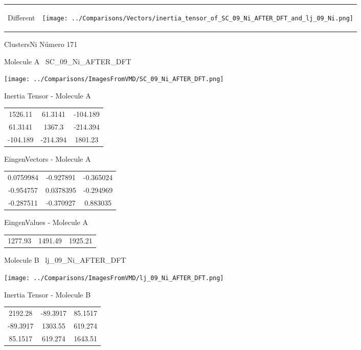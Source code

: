 \vtab[-5mm]
\begin{tabular}{*{2}{m{}}}
\begin{center}
\textcolor{NavyBlue}{\Large Different}
\end{center}
&
\begin{center}
\texttt{[image: ../Comparisons/Vectors/inertia\_tensor\_of\_SC\_09\_Ni\_AFTER\_DFT\_and\_lj\_09\_Ni.png]}
\end{center}
\end{tabular}

 \newpage

\vtab[-3cm]
\begin{center}
{\large ClustersNi \tab Número 171}
\end{center}
\begin{multicols}{2}
\begin{center}

Molecule A \
SC\_09\_Ni\_AFTER\_DFT

\texttt{[image: ../Comparisons/ImagesFromVMD/SC\_09\_Ni\_AFTER\_DFT.png]}

Inertia Tensor - Molecule A \\
\begin{tabular}{|c c c|}
1526.11	 & 	61.3141	 & 	-104.189	 \\
61.3141	 & 	1367.3	 & 	-214.394	 \\
-104.189	 & 	-214.394	 & 	1801.23
\end{tabular}

\vtab
 EingenVectors - Molecule A     \\
\begin{tabular}{|c c c|}
0.0759984	 & 	-0.927891	 & 	-0.365024	 \\
-0.954757	 & 	0.0378395	 & 	-0.294969	 \\
-0.287511	 & 	-0.370927	 & 	0.883035
\end{tabular}

\vtab
 EingenValues - Molecule A     \\
\begin{tabular}{|c c c|}
1277.93	 & 	1491.49	 & 	1925.21	 \\
\end{tabular}
\columnbreak

Molecule B \
lj\_09\_Ni\_AFTER\_DFT

\texttt{[image: ../Comparisons/ImagesFromVMD/lj\_09\_Ni\_AFTER\_DFT.png]}

Inertia Tensor - Molecule B \\
\begin{tabular}{|c c c|}
2192.28	 & 	-89.3917	 & 	85.1517	 \\
-89.3917	 & 	1303.55	 & 	619.274	 \\
85.1517	 & 	619.274	 & 	1643.51
\end{tabular}


\end{center}
\end{multicols}
